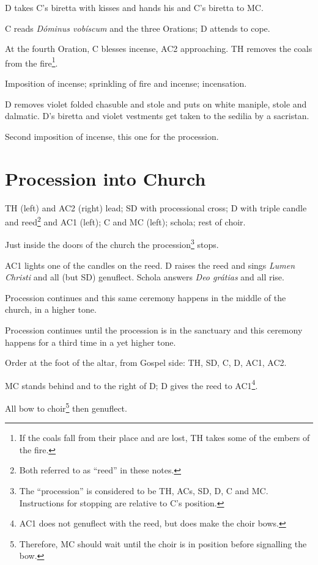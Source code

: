 {\rubric D takes C's biretta with kisses and hands his and C's biretta to MC.

\rubric C reads \textit{Dóminus vobíscum} and the three Orations; D attends to
cope.

\rubric At the fourth Oration, C blesses incense, AC2 approaching. TH removes
the coals from the fire\footnote{If the coals fall from their place and are
lost, TH takes some of the embers of the fire.}.

\rubric Imposition of incense; sprinkling of fire and incense; incensation.

\rubric D removes violet folded chasuble and stole and puts on white maniple,
stole and dalmatic. D's biretta and violet vestments get taken to the sedilia
by a sacristan.

\rubric Second imposition of incense, this one for the procession.

\section{Procession into Church}

\rubric TH (left) and AC2 (right) lead; SD with processional cross; D with
triple candle and reed\footnote{Both referred to as ``reed'' in these notes.}
and AC1 (left); C and MC (left); schola; rest of choir.

\rubric Just inside the doors of the church the procession\footnote{The
``procession'' is considered to be TH, ACs, SD, D, C and MC. Instructions for
stopping are relative to C's position.} stops. 

\rubric AC1 lights one of the candles on the reed. D raises the reed and sings
\textit{Lumen Christi} and all (but SD) genuflect. Schola answers \textit{Deo
grátias} and all rise.

\rubric Procession continues and this same ceremony happens in the middle of
the church, in a higher tone.

\rubric Procession continues until the procession is in the sanctuary and this
ceremony happens for a third time in a yet higher tone.

\rubric Order at the foot of the altar, from Gospel side: TH, SD, C, D, AC1,
AC2.

\rubric MC stands behind and to the right of D; D gives the reed to
AC1\footnote{AC1 does not genuflect with the reed, but does make the choir
bows.}.

\rubric All bow to choir\footnote{Therefore, MC should wait until the choir is
in position before signalling the bow.} then genuflect.

}
